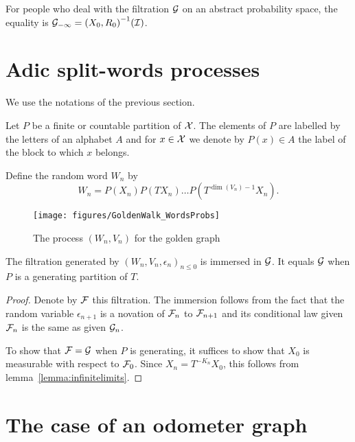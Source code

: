 \documentclass[12pt,a4paper]{article}
\begin{document}
\begin{remark}
For people who deal with the filtration $\mathcal{G}$ on an abstract probability space, 
the equality is $\mathcal{G}_{-\infty} = {(X_0, R_0)}^{-1}(\mathcal{I})$. 
\end{remark}

\section{Adic split-words processes}

We use the notations of the previous section. 

Let $P$ be a finite or countable partition of $\mathcal{X}$. 
The elements of $P$ are labelled by the letters of an alphabet $A$ 
and for $x \in \mathcal{X}$ we denote by $P(x) \in A$ the label of the block to which $x$ belongs.

Define the random word $W_n$ by 
$$
W_n = P(X_n)P(TX_n)\ldots P(T^{\dim(V_n)-1}X_n).
$$

\begin{figure}[!h]
\centering
	\texttt{[image: figures/GoldenWalk\_WordsProbs]}
\caption{The process $(W_n, V_n)$ for the golden graph}
\end{figure}

\begin{lemma}
The filtration generated by ${(W_n,V_n,\epsilon_n)}_{n \leq 0}$  
is immersed in $\mathcal{G}$. 
It equals $\mathcal{G}$ when $P$ is a generating partition of $T$.
\end{lemma}

\begin{proof}
Denote by $\mathcal{F}$ this filtration. The immersion follows from the fact 
that the random variable $\epsilon_{n+1}$ is 
a novation of $\mathcal{F}_n$ to $\mathcal{F}_{n+1}$ and its conditional law given 
$\mathcal{F}_n$ is the same as given $\mathcal{G}_n$. 

To show that $\mathcal{F}=\mathcal{G}$ when $P$ is generating, it suffices to show 
that $X_0$ is measurable with respect to $\mathcal{F}_0$. 
Since $X_n=T^{-K_n}X_0$, this follows from lemma~\ref{lemma:infinitelimits}. 
\end{proof}

\section{The case of an odometer graph}
\end{document}
